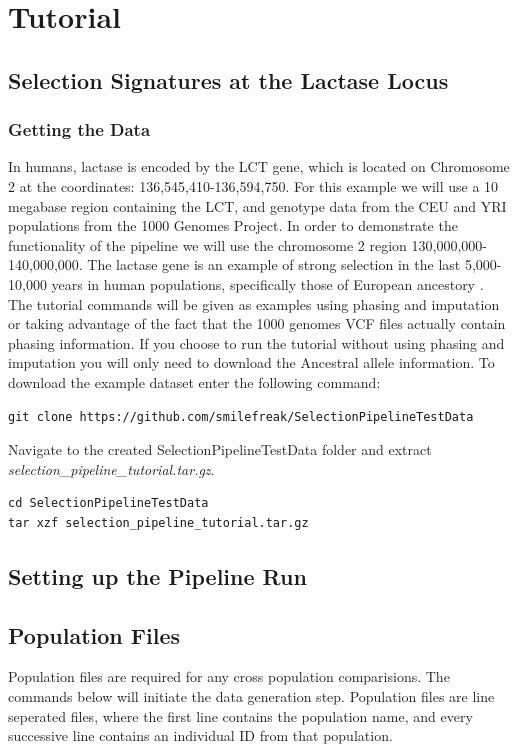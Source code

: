 \documentclass[a4paper,10pt]{article}
\begin{document}
\section{Tutorial}
\subsection{Selection Signatures at the Lactase Locus}
\subsubsection{Getting the Data}
In humans, lactase is encoded by the LCT gene, which is located on
Chromosome 2 at the coordinates:
136,545,410-136,594,750. For this example we will use a 10
megabase region containing the LCT, and genotype data from the CEU and YRI
populations from the 1000 Genomes Project. In order to demonstrate the
functionality of the pipeline we will use the chromosome 2 region
130,000,000-140,000,000. The lactase gene is an example of strong selection in
the last 5,000-10,000 years in human populations, specifically
those of European ancestory \citep{lactase2004}. The tutorial commands will be given as examples using phasing and imputation or taking advantage of the fact that the 1000 genomes VCF files actually contain phasing information. If you choose to run the tutorial without using phasing and imputation you will only need to download the Ancestral allele information.
To download the example dataset enter the following command:

{\small
\begin{verbatim}
git clone https://github.com/smilefreak/SelectionPipelineTestData
\end{verbatim}
}

\noindent
Navigate to the created SelectionPipelineTestData folder and extract \emph{selection\_pipeline\_tutorial.tar.gz}. 

\begin{verbatim}
cd SelectionPipelineTestData
tar xzf selection_pipeline_tutorial.tar.gz
\end{verbatim}

\subsection{Setting up the Pipeline Run}
\subsection{Population Files}
Population files are required for any cross population
comparisions. The commands below will initiate the data generation
step. Population files are line seperated files, where the first line
contains the population name, and every successive line contains an
individual ID from that population.\\
\end{document}
